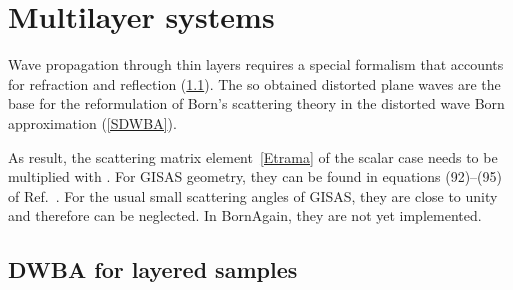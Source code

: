 

\chapter{Multilayer systems}  \label{sec:Multilayers}

%

Wave propagation through thin layers requires
a special formalism that accounts for
refraction and reflection (\cref{Swave21}).
The so obtained distorted plane waves are the base
for the reformulation of Born's scattering theory
in the distorted wave Born approximation (\cref{SDWBA}).



As result, the scattering matrix element~\cref{Etrama} of the scalar case
needs to be multiplied with .
%
For GISAS geometry, they can be found in equations (92)--(95) of Ref.~\cite{ReLL09}.
For the usual small scattering angles of GISAS,
they are close to unity and therefore can be neglected.
In BornAgain, they are not yet implemented.



\section{DWBA for layered samples}\label{Swave21}

